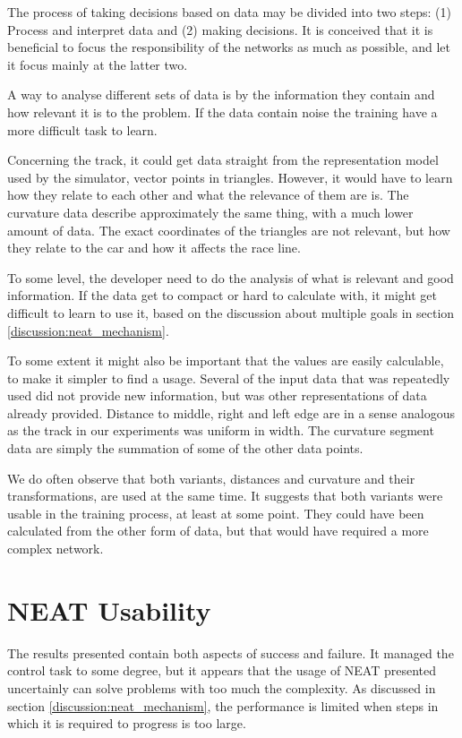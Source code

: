The process of taking decisions based on data may be divided into two steps: (1) Process and interpret data and (2) making decisions. It is conceived that it is beneficial to focus the responsibility of the networks as much as possible, and let it focus mainly at the latter two. 


A way to analyse different sets of data is by the information they contain and how relevant it is to the problem. If the data contain noise the training have a more difficult task to learn.

Concerning the track, it could get data straight from the representation model used by the simulator, vector points in triangles. However, it would have to learn how they relate to each other and what the relevance of them are is. The curvature data describe approximately the same thing, with a much lower amount of data. The exact coordinates of the triangles are not relevant, but how they relate to the car and how it affects the race line. 

To some level, the developer need to do the analysis of what is relevant and good information. If the data get to compact or hard to calculate with, it might get difficult to learn to use it, based on the discussion about multiple goals in section \ref{discussion:neat_mechanism}.

To some extent it might also be important that the values are easily calculable, to make it simpler to find a usage. Several of the input data that was repeatedly used did not provide new information, but was other representations of data already provided. Distance to middle, right and left edge are in a sense analogous as the track in our experiments was uniform in width. The curvature segment data are simply the summation of some of the other data points.

We do often observe that both variants, distances and curvature and their transformations, are used at the same time. It suggests that both variants were usable in the training process, at least at some point. They could have been calculated from the other form of data, but that would have required a more complex network.

\section{NEAT Usability}

The results presented contain both aspects of success and failure. It managed the control task to some degree, but it appears that the usage of NEAT presented uncertainly can solve problems with too much the complexity. As discussed in section \ref{discussion:neat_mechanism}, the performance is limited when steps in which it is required to progress is too large.

